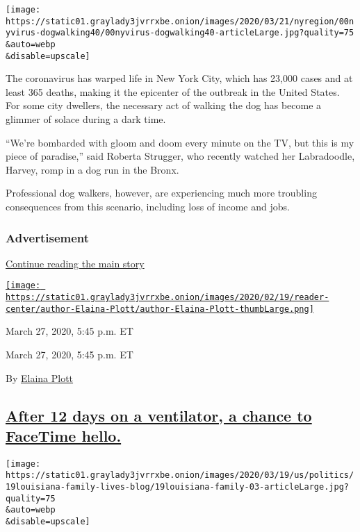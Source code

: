 \texttt{[image: https://static01.graylady3jvrrxbe.onion/images/2020/03/21/nyregion/00nyvirus-dogwalking40/00nyvirus-dogwalking40-articleLarge.jpg?quality=75\\\&auto=webp\\\&disable=upscale]}

The coronavirus has warped life in New York City, which has 23,000 cases
and at least 365 deaths, making it the epicenter of the outbreak in the
United States. For some city dwellers, the necessary act of walking the
dog has become a glimmer of solace during a dark time.

``We're bombarded with gloom and doom every minute on the TV, but this
is my piece of paradise,'' said Roberta Strugger, who recently watched
her Labradoodle, Harvey, romp in a dog run in the Bronx.

Professional dog walkers, however, are experiencing much more troubling
consequences from this scenario, including loss of income and jobs.

\hypertarget{advertisement}{%
\subsubsection{Advertisement}\label{advertisement}}

\protect\hyperlink{after-dfp-ad-mid1}{Continue reading the main story}

\href{https://www.nytimes3xbfgragh.onion/by/elaina-plott}{\texttt{[image: https://static01.graylady3jvrrxbe.onion/images/2020/02/19/reader-center/author-Elaina-Plott/author-Elaina-Plott-thumbLarge.png]}}

March 27, 2020, 5:45 p.m. ET

March 27, 2020, 5:45 p.m. ET

By \href{https://www.nytimes3xbfgragh.onion/by/elaina-plott}{Elaina
Plott}

\hypertarget{after-12-days-on-a-ventilator-a-chance-to-facetime-hello}{%
\subsection{\texorpdfstring{\protect\hyperlink{after-12-days-on-a-ventilator-a-chance-to-facetime-hello}{After
12 days on a ventilator, a chance to FaceTime
hello.}}{After 12 days on a ventilator, a chance to FaceTime hello.}}\label{after-12-days-on-a-ventilator-a-chance-to-facetime-hello}}

\texttt{[image: https://static01.graylady3jvrrxbe.onion/images/2020/03/19/us/politics/19louisiana-family-lives-blog/19louisiana-family-03-articleLarge.jpg?quality=75\\\&auto=webp\\\&disable=upscale]}

